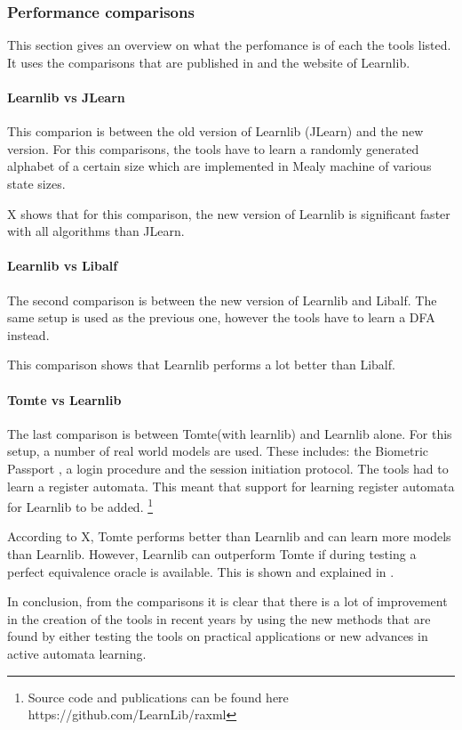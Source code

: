 \documentclass[multi,crop=false,class=article]{standalone}
\begin{document}
\subsubsection{Performance comparisons}
\label{ssec:performance_compare}
This section gives an overview on what the perfomance is of each the tools
listed. It uses the comparisons that are published in
\cite{Aarts2014}\cite{Aarts2015} and
the website of
Learnlib.

\paragraph{Learnlib vs JLearn}

\todo{Image of comparison between Learnlib and JLearn] }
This comparion is between the old version of Learnlib (JLearn) and the new
version. For this comparisons, the tools have to learn a randomly generated
alphabet of a certain size which are implemented in Mealy machine of various
state sizes.

X shows that for this comparison, the new version of Learnlib is
significant faster with all algorithms than JLearn.

\paragraph{Learnlib vs Libalf}
The second comparison is between the new version of Learnlib and Libalf.
The same setup is used as the previous one, however the tools have to learn a
DFA instead.

This comparison shows that Learnlib performs a lot better than Libalf.

\paragraph{Tomte vs Learnlib}
The last comparison is between Tomte(with learnlib) and Learnlib alone.
For this setup, a number of real world models are used. These includes: the
Biometric Passport \cite{Aarts2010}, a login procedure and the session
initiation protocol. The tools had to learn a register automata. This meant
that support for learning register automata for Learnlib to be added.
\footnote{Source code and publications can be found here
https://github.com/LearnLib/raxml}

According to X, Tomte performs better than Learnlib and can learn more models
than Learnlib. However, Learnlib can outperform Tomte if during testing a
perfect equivalence oracle is available. This is shown and explained in
\cite{Aarts2014}.


In conclusion, from the comparisons it is clear that there is a lot of
improvement in the creation of the tools in recent years by using the new
methods that are found by either testing the tools on practical applications or
new advances in active automata learning.
\end{document}
